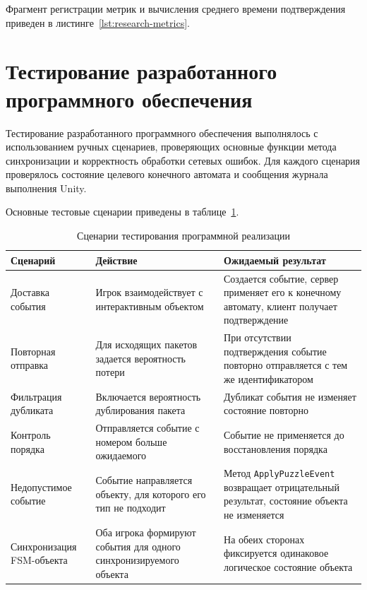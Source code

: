 Фрагмент регистрации метрик и вычисления среднего времени подтверждения приведен в листинге~\ref{lst:research-metrics}.


\section{Тестирование разработанного программного обеспечения}

Тестирование разработанного программного обеспечения выполнялось с использованием ручных сценариев, проверяющих основные функции метода синхронизации и корректность обработки сетевых ошибок. Для каждого сценария проверялось состояние целевого конечного автомата и сообщения журнала выполнения Unity.

Основные тестовые сценарии приведены в таблице~\ref{tab:implementation-tests}.

\begin{table}[H]
	\caption{Сценарии тестирования программной реализации}
	\label{tab:implementation-tests}
	\centering
	\renewcommand{\arraystretch}{1.2}
	\begin{tabular}{|p{4cm}|p{5cm}|p{5cm}|}
		\hline
		Сценарий & Действие & Ожидаемый результат \\ \hline
		Доставка события & Игрок взаимодействует с интерактивным объектом & Создается событие, сервер применяет его к конечному автомату, клиент получает подтверждение \\ \hline
		Повторная отправка & Для исходящих пакетов задается вероятность потери & При отсутствии подтверждения событие повторно отправляется с тем же идентификатором \\ \hline
		Фильтрация дубликата & Включается вероятность дублирования пакета & Дубликат события не изменяет состояние повторно \\ \hline
		Контроль порядка & Отправляется событие с номером больше ожидаемого & Событие не применяется до восстановления порядка \\ \hline
		Недопустимое событие & Событие направляется объекту, для которого его тип не подходит & Метод \texttt{ApplyPuzzleEvent} возвращает отрицательный результат, состояние объекта не изменяется \\ \hline
		Синхронизация FSM-объекта & Оба игрока формируют события для одного синхронизируемого объекта & На обеих сторонах фиксируется одинаковое логическое состояние объекта \\ \hline
	\end{tabular}
\end{table}

